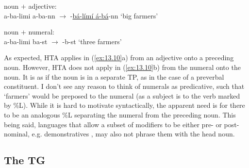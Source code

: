 \documentclass[output=paper]{langsci/langscibook}
\begin{document}
\ea\label{ex:13.10}
    \ea noun $+$ adjective:\\
        a-ba-limi  a-ba-nn  ${\rightarrow}$
            -\underline{bá-límí  á-bá}-nn  ‘big farmers’
        \vspace{.75\baselineskip}
    \ex noun $+$ numeral:\\
        a-ba-limi ba-st  ${\rightarrow}$  -b-st  ‘three farmers’
        \vspace{.75\baselineskip}
    \z
\z
As expected, \gls{HTA} applies in (\ref{ex:13.10}a) from an adjective onto a
preceding noun. However, \gls{HTA} does not apply in (\ref{ex:13.10}b) from
the numeral onto the noun. It is as if the noun is in a separate TP, as in the
case of a preverbal constituent. I don’t see any reason to think of numerals
as predicative, such that ‘farmers’ would be preposed to the numeral (as a
subject is to the verb marked by \%L). While it is hard to motivate
syntactically, the apparent need is for there to be an analogous \%L separating
the numeral from the preceding noun. This being said,  languages that
allow a subset of modifiers to be either pre- or post-nominal, e.g.
demonstratives \parencite{vandeVelde2005}, may also not phrase them with the head noun.

\subsection{The TG}\label{sub:13.2.2}
\end{document}
